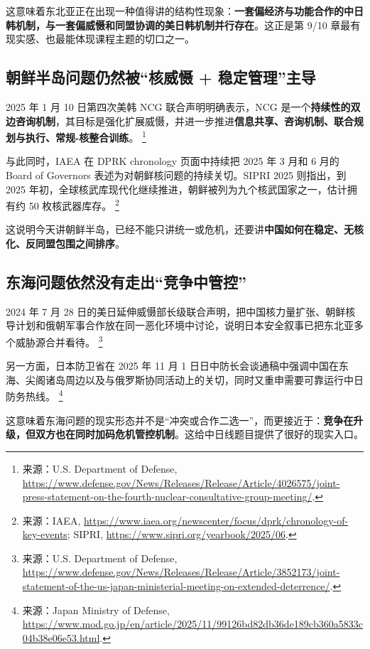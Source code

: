 \documentclass[a4paper]{article}
\begin{document}
这意味着东北亚正在出现一种值得讲的结构性现象：\textbf{一套偏经济与功能合作的中日韩机制，与一套偏威慑和同盟协调的美日韩机制并行存在}。这正是第 9/10 章最有现实感、也最能体现课程主题的切口之一。

\subsection{朝鲜半岛问题仍然被``核威慑 + 稳定管理''主导}

2025 年 1 月 10 日第四次美韩 NCG 联合声明明确表示，NCG 是一个\textbf{持续性的双边咨询机制}，其目标是强化扩展威慑，并进一步推进\textbf{信息共享、咨询机制、联合规划与执行、常规-核整合训练}。%
\footnote{来源：U.S. Department of Defense, \url{https://www.defense.gov/News/Releases/Release/Article/4026575/joint-press-statement-on-the-fourth-nuclear-consultative-group-meeting/}.}

与此同时，IAEA 在 DPRK chronology 页面中持续把 2025 年 3 月和 6 月的 Board of Governors 表述为对朝鲜核问题的持续关切。SIPRI 2025 则指出，到 2025 年初，全球核武库现代化继续推进，朝鲜被列为九个核武国家之一，估计拥有约 50 枚核武器库存。%
\footnote{来源：IAEA, \url{https://www.iaea.org/newscenter/focus/dprk/chronology-of-key-events}; SIPRI, \url{https://www.sipri.org/yearbook/2025/06}.}

这说明今天讲朝鲜半岛，已经不能只讲统一或危机，还要讲\textbf{中国如何在稳定、无核化、反同盟包围之间排序}。

\subsection{东海问题依然没有走出``竞争中管控''}

2024 年 7 月 28 日的美日延伸威慑部长级联合声明，把中国核力量扩张、朝鲜核导计划和俄朝军事合作放在同一恶化环境中讨论，说明日本安全叙事已把东北亚多个威胁源合并看待。%
\footnote{来源：U.S. Department of Defense, \url{https://www.defense.gov/News/Releases/Release/Article/3852173/joint-statement-of-the-us-japan-ministerial-meeting-on-extended-deterrence/}.}

另一方面，日本防卫省在 2025 年 11 月 1 日日中防长会谈通稿中强调中国在东海、尖阁诸岛周边以及与俄罗斯协同活动上的关切，同时又重申需要可靠运行中日防务热线。%
\footnote{来源：Japan Ministry of Defense, \url{https://www.mod.go.jp/en/article/2025/11/99126bd82db36de189cb360a5833c04b38e06e53.html}.}

这意味着东海问题的现实形态并不是``冲突或合作二选一''，而更接近于：\textbf{竞争在升级，但双方也在同时加码危机管控机制}。这给中日线题目提供了很好的现实入口。
\end{document}
